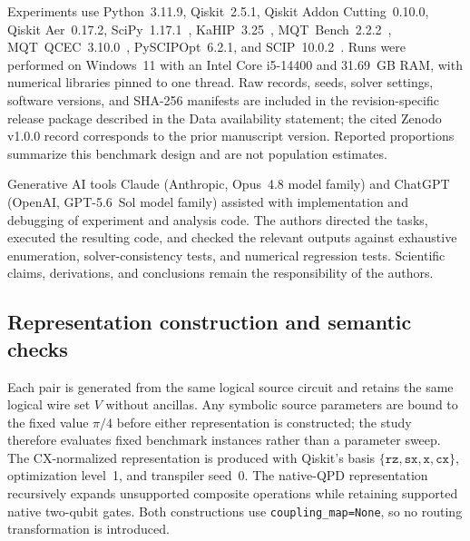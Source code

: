 \documentclass[
  aps,
  pra,
  reprint,
  amsmath,
  amssymb,
  longbibliography,
  nofootinbib,
  floatfix
]{revtex4-2}
\theoremstyle{plain}
\begin{document}
Experiments use Python~3.11.9, Qiskit~2.5.1, Qiskit Addon Cutting~0.10.0, Qiskit Aer~0.17.2, SciPy~1.17.1~\cite{scipy}, KaHIP~3.25~\cite{kahip}, MQT~Bench~2.2.2~\cite{mqtbench}, MQT~QCEC~3.10.0~\cite{burgholzer2021qcec}, PySCIPOpt~6.2.1, and SCIP~10.0.2~\cite{scip}. Runs were performed on Windows~11 with an Intel Core i5-14400 and 31.69~GB RAM, with numerical libraries pinned to one thread. Raw records, seeds, solver settings, software versions, and SHA-256 manifests are included in the revision-specific release package described in the Data availability statement; the cited Zenodo v1.0.0 record corresponds to the prior manuscript version. Reported proportions summarize this benchmark design and are not population estimates.

Generative AI tools Claude (Anthropic, Opus~4.8 model family) and ChatGPT (OpenAI, GPT-5.6~Sol model family) assisted with implementation and debugging of experiment and analysis code. The authors directed the tasks, executed the resulting code, and checked the relevant outputs against exhaustive enumeration, solver-consistency tests, and numerical regression tests. Scientific claims, derivations, and conclusions remain the responsibility of the authors.

\subsection{Representation construction and semantic checks}
\label{sec:rep-construction}

Each pair is generated from the same logical source circuit and retains the same logical wire set $V$ without ancillas. Any symbolic source parameters are bound to the fixed value $\pi/4$ before either representation is constructed; the study therefore evaluates fixed benchmark instances rather than a parameter sweep. The CX-normalized representation is produced with Qiskit's basis $\{\texttt{rz},\texttt{sx},\texttt{x},\texttt{cx}\}$, optimization level~1, and transpiler seed~0. The native-QPD representation recursively expands unsupported composite operations while retaining supported native two-qubit gates. Both constructions use \texttt{coupling\_map=None}, so no routing transformation is introduced.
\end{document}
